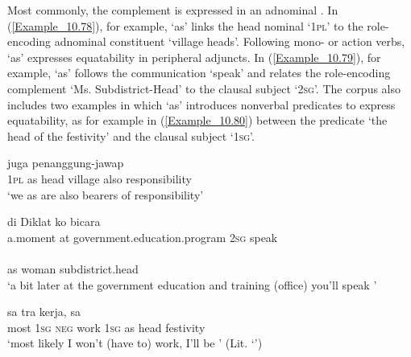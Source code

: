 Most commonly, the complement is expressed in an adnominal . In (\ref{Example_10.78}), for example,  ‘as’ links the head nominal  ‘\textsc{1pl}’ to the role-encoding adnominal constituent  ‘village heads’. Following mono- or  action verbs,  ‘as’ expresses equatability in peripheral adjuncts. In (\ref{Example_10.79}), for example,  ‘as’ follows the communication   ‘speak’ and relates the role-encoding complement  ‘Ms. Subdistrict-Head’ to the clausal subject  ‘\textsc{2sg}’. The corpus also includes two examples in which  ‘as’ introduces nonverbal predicates to express equatability, as for example in (\ref{Example_10.80}) between the predicate  ‘the head of the festivity’ and the clausal subject  ‘\textsc{1sg}’.


\ea
\label{Example_10.78}
 {} {} {} {juga} {penanggung-jawap}\\ %
 \textsc{1pl}  as  head  village  also  responsibility\\
\glt 
‘we as  are also bearers of responsibility’ \textstyleExampleSource{[081008-001-Cv.0035]}
\z

\ea
\label{Example_10.79}
 {di} {{Diklat}} {ko} {bicara}\\ %
 {a.moment}  at  {government.education.program}  \textsc{2sg}  speak\\
\gll {}  {}  {}\\
 as  {woman}  {subdistrict.head}\\
\glt 
‘a bit later at the government education and training (office) you’ll speak ’ \textstyleExampleSource{[081010-001-Cv.0099]}
\z

\ea
\label{Example_10.80}
 {sa} {tra} {kerja,} {sa} {} {} {}\\ %
 most  \textsc{1sg}  \textsc{neg}  work  \textsc{1sg}  as  head  festivity\\
 ‘most likely I won’t (have to) work, I’ll be ’ (Lit. ‘’) \textstyleExampleSource{[080919-004-NP.0068]}
\z


